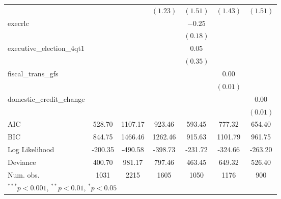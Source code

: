 \begin{tabular}{l c c c c c c }
                          &               &              & $(1.23)$      & $(1.51)$      & $(1.43)$      & $(1.51)$      \\
execrlc                   &               &              &               & $-0.25$       &               &               \\
                          &               &              &               & $(0.18)$      &               &               \\
executive\_election\_4qt1 &               &              &               & $0.05$        &               &               \\
                          &               &              &               & $(0.35)$      &               &               \\
fiscal\_trans\_gfs        &               &              &               &               & $0.00$        &               \\
                          &               &              &               &               & $(0.01)$      &               \\
domestic\_credit\_change  &               &              &               &               &               & $0.00$        \\
                          &               &              &               &               &               & $(0.01)$      \\
\hline
AIC                       & 528.70        & 1107.17      & 923.46        & 593.45        & 777.32        & 654.40        \\
BIC                       & 844.75        & 1466.46      & 1262.46       & 915.63        & 1101.79       & 961.75        \\
Log Likelihood            & -200.35       & -490.58      & -398.73       & -231.72       & -324.66       & -263.20       \\
Deviance                  & 400.70        & 981.17       & 797.46        & 463.45        & 649.32        & 526.40        \\
Num. obs.                 & 1031          & 2215         & 1605          & 1050          & 1176          & 900           \\
\hline
\multicolumn{7}{l}{\scriptsize{$^{***}p<0.001$, $^{**}p<0.01$, $^*p<0.05$}}
\end{tabular}
